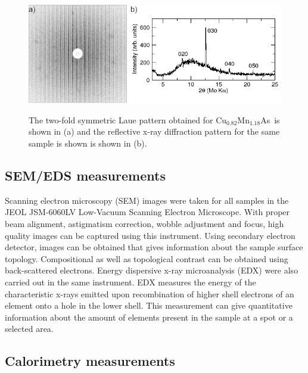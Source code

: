 \documentclass[letterpaper,10pt,doublespacing,edeposit]{uiucthesis2020}
\newcommand*{\cumnas}{Cu$_{0.82}$Mn$_{1.18}$As}
\begin{document}
\begin{mainmatter}

\begin{figure}
\centering\includegraphics[width=\columnwidth]{figures/ch3/hex_CuMnAs_alignment.png} \\
\caption{\label{fig:hex_CuMnAs_alignment}
The two-fold symmetric Laue pattern obtained for \cumnas\ is shown in (a) and the reflective x-ray diffraction pattern for the same sample is shown is shown in (b).
}
\end{figure}

\subsection{SEM/EDS measurements}

Scanning electron microscopy (SEM) images were taken for all samples in the JEOL JSM-6060LV Low-Vacuum Scanning Electron Microscope. With proper beam alignment, astigmatism correction, wobble adjustment and focus, high quality images can be captured using this instrument. Using secondary electron detector, images can be obtained that gives information about the sample surface topology. Compositional as well as topological contrast can be obtained using back-scattered electrons. Energy dispersive x-ray microanalysis (EDX) were also carried out in the same instrument. EDX measures the energy of the characteristic x-rays emitted upon recombination of higher shell electrons of an element onto a hole in the lower shell.	This measurement can give quantitative information about the amount of elements present in the sample at a spot or a selected area.

\subsection{Calorimetry measurements}



\end{mainmatter}
\end{document}
